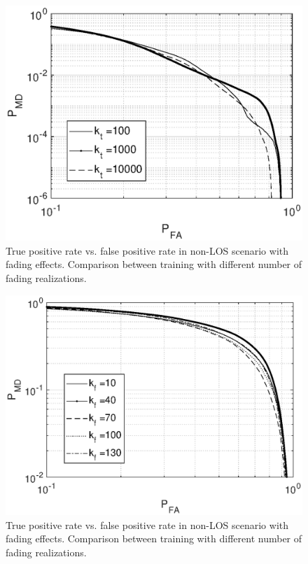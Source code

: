 \documentclass[draftcls,onecolumn,12pt]{IEEEtran}
\begin{document}
\begin{figure}
    \centering
    \includegraphics[width=0.5\columnwidth]{res_avg_nTrain_oneClass.eps}
    \caption{True positive rate vs. false positive rate in non-LOS scenario with fading effects. Comparison between training with different number of fading realizations.}
    \label{fig:faded}
\end{figure}

\begin{figure}
    \centering
    \includegraphics[width=0.5\columnwidth]{res_avg_nFading_oneClass.eps}
    \caption{True positive rate vs. false positive rate in non-LOS scenario with fading effects. Comparison between training with different number of fading realizations.}
    \label{fig:faded}
\end{figure}
\newpage 



%
%
\renewcommand*{\bibfont}{\footnotesize}

\printbibliography
\end{document}
